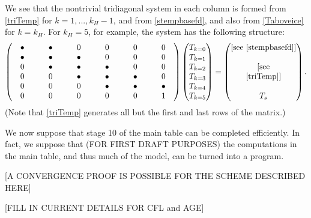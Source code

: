 \documentclass[12pt,final]{amsart}%
\theoremstyle{plain}
\theoremstyle{definition}
\theoremstyle{remark}
\begin{document}
We see that the nontrivial tridiagonal system in each column is formed from \eqref{triTemp} for $k=1,...,k_H-1$, and from \eqref{stempbasefd}, and also from \eqref{Taboveice} for $k=k_H$.  For $k_H=5$, for example, the system has the following structure:
\newcommand{\bul}{\bullet}
    $$\begin{pmatrix} \quad \bul \quad & \quad \bul \quad & \quad 0 \quad & \quad 0 \quad & \quad 0 \quad & \quad 0 \quad \\ \bul &\bul & \bul & 0 & 0 & 0 \\ 0 & \bul & \bul & \bul & 0 & 0 \\ 0 & 0 & \bul & \bul & \bul & 0 \\ 0 & 0 & 0 & \bul & \bul & \bul \\ 0 & 0 & 0 & 0 & 0 & 1 \end{pmatrix} \begin{pmatrix} T_{k=0} \\ T_{k=1} \\ T_{k=2} \\ T_{k=3} \\ T_{k=4} \\ T_{k=5} \end{pmatrix}  =  \begin{pmatrix} [\text{see \eqref{stempbasefd}}] \\  \\ [\text{see} \\ \eqref{triTemp}] \\  \\ T_s \end{pmatrix}.$$
(Note that \eqref{triTemp} generates all but the first and last rows of the matrix.)

We now suppose that stage 10 of the main table can be completed efficiently.  In fact, we suppose that (FOR FIRST DRAFT PURPOSES) the computations in the main table, and thus much of the model, can be turned into a program.

[A CONVERGENCE PROOF IS POSSIBLE FOR THE SCHEME DESCRIBED HERE]

[FILL IN CURRENT DETAILS FOR CFL and AGE]
\end{document}
